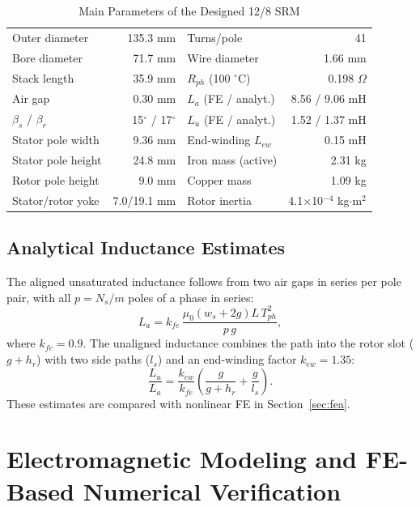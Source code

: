 \documentclass[journal]{IEEEtran}
\begin{document}
\begin{table}[!t]
\caption{Main Parameters of the Designed 12/8 SRM}
\label{tab:design}
\centering
\renewcommand{\arraystretch}{1.08}
\setlength{\tabcolsep}{4pt}
\begin{tabular}{l r | l r}
\hline
Outer diameter & 135.3 mm & Turns/pole & 41\\
Bore diameter & 71.7 mm & Wire diameter & 1.66 mm\\
Stack length & 35.9 mm & $R_{ph}$ (100 $^\circ$C) & 0.198 $\Omega$\\
Air gap & 0.30 mm & $L_a$ (FE / analyt.) & 8.56 / 9.06 mH\\
$\beta_s$ / $\beta_r$ & 15$^\circ$ / 17$^\circ$ & $L_u$ (FE / analyt.) & 1.52 / 1.37 mH\\
Stator pole width & 9.36 mm & End-winding $L_{ew}$ & 0.15 mH\\
Stator pole height & 24.8 mm & Iron mass (active) & 2.31 kg\\
Rotor pole height & 9.0 mm & Copper mass & 1.09 kg\\
Stator/rotor yoke & 7.0/19.1 mm & Rotor inertia & 4.1$\times$10$^{-4}$ kg$\cdot$m$^2$\\
\hline
\end{tabular}
\end{table}

\subsection{Analytical Inductance Estimates}
The aligned unsaturated inductance follows from two air gaps in series per pole
pair, with all $p=N_s/m$ poles of a phase in series:
\begin{equation}
L_a = k_{fe}\,\frac{\mu_0 (w_s+2g) L\, T_{ph}^2}{p\,g},
\label{eq:La}
\end{equation}
where $k_{fe}=0.9$. The unaligned inductance combines the path into the rotor
slot ($g+h_r$) with two side paths ($l_s$) and an end-winding factor
$k_{ew}=1.35$:
\begin{equation}
\frac{L_u}{L_a} = \frac{k_{ew}}{k_{fe}}\left(\frac{g}{g+h_r}+\frac{g}{l_s}\right).
\label{eq:Lu}
\end{equation}
These estimates are compared with nonlinear FE in Section~\ref{sec:fea}.

\section{Electromagnetic Modeling and FE-Based Numerical Verification}
\end{document}
